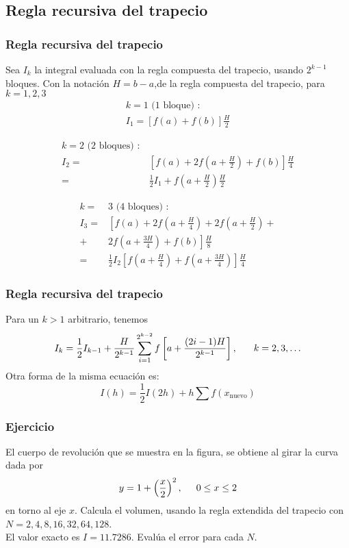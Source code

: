 \subsection{Regla recursiva del trapecio}
\begin{frame}
\frametitle{Regla recursiva del trapecio}
Sea $I_{k}$ la integral evaluada con la regla compuesta del trapecio, usando $2^{k-1}$ bloques. Con la notaci\'{o}n $H=b-a$,de la regla compuesta del trapecio, para $k=1,2,3$
\[
	\begin{split}
		k=1 \text{ (1 bloque) }: \\
		I_{1} = [f(a) + f(b)] \frac{H}{2}
	\end{split}
\]
\end{frame}
\begin{frame}
\[
	\begin{split}
		k=2 \text{ (2 bloques) }: \\
		I_{2} =& \left[ f(a) + 2f\left(a+\frac{H}{2} \right) + f(b) \right] \frac{H}{4} \\
		=& \frac{1}{2} I_{1} + f \left( a + \frac{H}{2} \right) \frac{H}{2}
	\end{split}
\]
\end{frame}
\begin{frame}
\[
	\begin{split}
		k=&3 \text{ (4 bloques) }: \\
		I_{3} =& \left[ f(a) + 2f \left(a + \frac{H}{4} \right) + 2 f \left( a + \frac{H}{2} \right) + \right.\\
		 +& \left. 2 f \left( a + \frac{3H}{4} \right)+ f(b) \right] \frac{H}{8} \\
		=& \frac{1}{2} I_{2} \left[f\left(a+\frac{H}{4} \right) + f\left(a+\frac{3H}{4}\right) \right] \frac{H}{4}
	\end{split}
\]
\end{frame}
\begin{frame}
\frametitle{Regla recursiva del trapecio}
Para un $k>1$ arbitrario, tenemos
\[ I_{k} = \dfrac{1}{2} I_{k-1} + \dfrac{H}{2^{k-1}} \sum_{i=1}^{2^{k-2}} f \left[ a + \dfrac{(2i-1)H}{2^{k-1}} \right], \hspace{0.6cm} k=2,3,\ldots\]
Otra forma de la misma ecuaci\'{o}n es:
\[ I(h) = \dfrac{1}{2}I(2h) + h \sum f(x_{\text{nuevo}}) \]
\end{frame}
\begin{frame}
\frametitle{Ejercicio}
El cuerpo de revoluci\'{o}n que se muestra en la figura, se obtiene al girar la curva dada por
\[ y= 1 + \left( \dfrac{x}{2} \right)^{2}, \hspace{0.5cm} 0 \leq x \leq 2\]
en torno al eje $x$. Calcula el volumen, usando la regla extendida del trapecio con $N=2,4,8,16,32,64,128$.
\\
\bigskip
El valor exacto es $I=11.7286$. Eval\'{u}a el error para cada $N$.
\end{frame}
